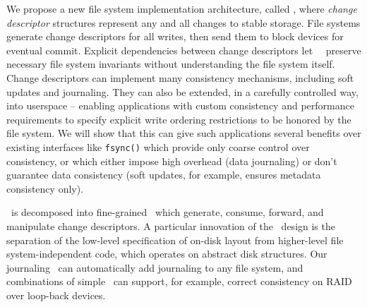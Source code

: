 We propose a new file system implementation architecture, called \emph{\Kudos},
where \emph{change descriptor} structures represent any and all changes to
stable storage. File systems generate change descriptors for all writes, then
send them to block devices for eventual commit. Explicit dependencies between
change descriptors let \Kudos\ \modules\ preserve necessary file system
invariants without understanding the file system itself. Change descriptors can
implement many consistency mechanisms, including soft updates and journaling.
They can also be extended, in a carefully controlled way, into userspace --
enabling applications with custom consistency and performance requirements to
specify explicit write ordering restrictions to be honored by the file system.
We will show that this can give such applications several benefits over existing
interfaces like \texttt{fsync()} which provide only coarse control over
consistency, or which either impose high overhead (data journaling) or don't
guarantee data consistency (soft updates, for example, ensures metadata
consistency only).

\Kudos\ is decomposed into fine-grained \modules\ which generate, consume,
forward, and manipulate change descriptors. A particular innovation of the
\module\ design is the separation of the low-level specification of on-disk
layout from higher-level file system-independent code, which operates on
abstract disk structures. Our journaling \module\ can automatically add
journaling to any file system, and combinations of simple \modules\ can support,
for example, correct consistency on RAID over loop-back devices.
